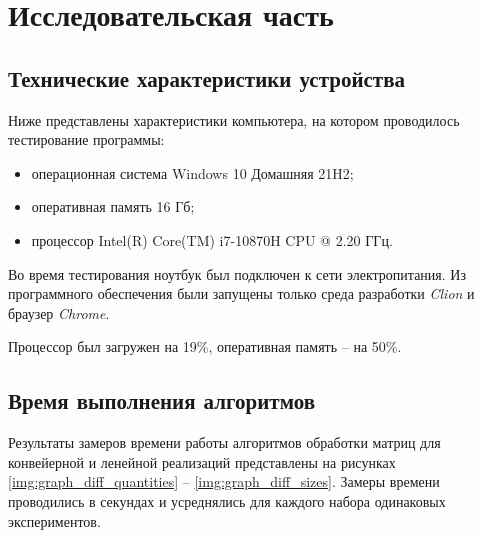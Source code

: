 \chapter{Исследовательская часть}

\section{Технические характеристики устройства}

Ниже представлены характеристики компьютера, на котором проводилось тестирование программы:
\begin{itemize}[label=---]
    \item операционная система Windows 10 Домашняя 21H2;
    \item оперативная память 16 Гб;
    \item процессор Intel(R) Core(TM) i7-10870H CPU @ 2.20 ГГц.
\end{itemize}

Во время тестирования ноутбук был подключен к сети электропитания. Из программного обеспечения были запущены только среда разработки \textit{Clion} и браузер \textit{Chrome}.

Процессор был загружен на 19\%, оперативная память -- на 50\%.

\clearpage






\section{Время выполнения алгоритмов}

Результаты замеров времени работы алгоритмов обработки матриц для конвейерной и ленейной реализаций представлены на рисунках \ref{img:graph_diff_quantities} -- \ref{img:graph_diff_sizes}. Замеры времени проводились в секундах и усреднялись для каждого набора одинаковых экспериментов.


